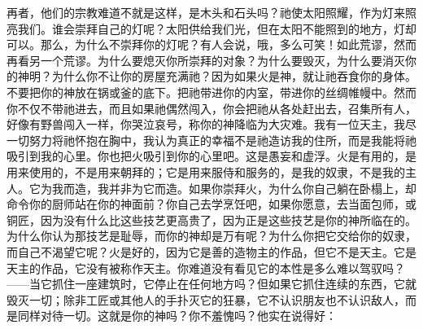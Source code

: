 再者，他们的宗教难道不就是这样，是木头和石头吗？祂使太阳照耀，作为灯来照亮我们。谁会崇拜自己的灯呢？太阳供给我们光，但在太阳不能照到的地方，灯却可以。那么，为什么不崇拜你的灯呢？有人会说，哦，多么可笑！如此荒谬，然而再看另一个荒谬。为什么要熄灭你所崇拜的对象？为什么要毁灭，为什么要消灭你的神明？为什么你不让你的房屋充满祂？因为如果火是神，就让祂吞食你的身体。不要把你的神放在锅或釜的底下。把祂带进你的内室，带进你的丝绸帷幔中。然而你不仅不带祂进去，而且如果祂偶然闯入，你会把祂从各处赶出去，召集所有人，好像有野兽闯入一样，你哭泣哀号，称你的神降临为大灾难。我有一位天主，我尽一切努力将祂怀抱在胸中，我认为真正的幸福不是祂造访我的住所，而是我能将祂吸引到我的心里。你也把火吸引到你的心里吧。这是愚妄和虚浮。火是有用的，是用来使用的，不是用来朝拜的；它是用来服侍和服务的，是我的奴隶，不是我的主人。它为我而造，我并非为它而造。如果你崇拜火，为什么你自己躺在卧榻上，却命令你的厨师站在你的神面前？你自己去学烹饪吧，如果你愿意，去当面包师，或铜匠，因为没有什么比这些技艺更高贵了，因为正是这些技艺是你的神所临在的。为什么你认为那技艺是耻辱，而你的神却是万有呢？为什么你把它交给你的奴隶，而自己不渴望它呢？火是好的，因为它是善的造物主的作品，但它不是天主。它是天主的作品，它没有被称作天主。你难道没有看见它的本性是多么难以驾驭吗？——当它抓住一座建筑时，它停止在任何地方吗？但如果它抓住连续的东西，它就毁灭一切；除非工匠或其他人的手扑灭它的狂暴，它不认识朋友也不认识敌人，而是同样对待一切。这就是你的神吗？你不羞愧吗？他实在说得好：\par

